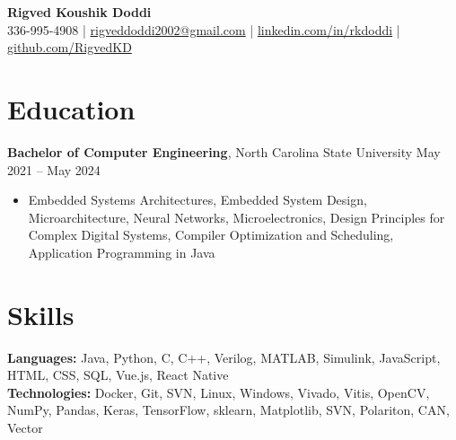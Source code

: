 \documentclass[letterpaper,9pt]{article}
\begin{document}
\begin{center}
    {\Large \textbf{Rigved Koushik Doddi}}\\
    \vspace{1pt}
    \small 336-995-4908 | \href{mailto:rigveddoddi2002@gmail.com}{rigveddoddi2002@gmail.com} | \href{https://www.linkedin.com/in/rkdoddi/}{linkedin.com/in/rkdoddi} | \href{https://github.com/RigvedKD}{github.com/RigvedKD}\\
\end{center}

\section*{Education}
\noindent \textbf{Bachelor of Computer Engineering}, North Carolina State University \hfill May 2021 – May 2024
\begin{itemize}[leftmargin=*,itemsep=0pt,topsep=0pt]
    \item Embedded Systems Architectures, Embedded System Design, Microarchitecture, Neural Networks, Microelectronics, Design Principles for Complex Digital Systems, Compiler Optimization and Scheduling, Application Programming in Java
\end{itemize}

\section*{Skills}
\noindent \textbf{Languages:} Java, Python, C, C++, Verilog, MATLAB, Simulink, JavaScript, HTML, CSS, SQL, Vue.js, React Native \\
\noindent \textbf{Technologies:} Docker, Git, SVN, Linux, Windows, Vivado, Vitis, OpenCV, NumPy, Pandas, Keras, TensorFlow, sklearn, Matplotlib, SVN, Polariton, CAN, Vector



\end{document}
